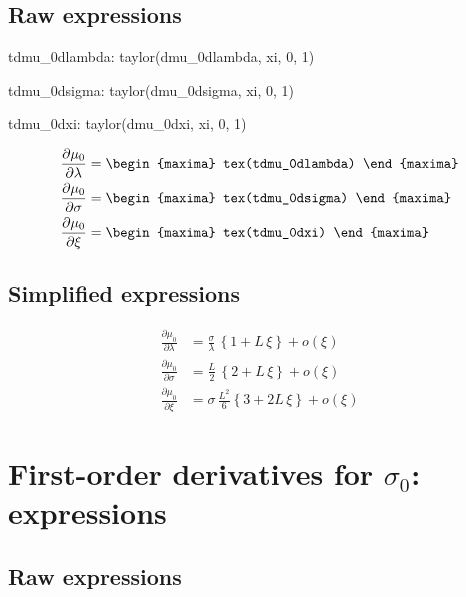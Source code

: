 \subsection*{Raw expressions}
\begin{maxima}
  tdmu_0dlambda: taylor(dmu_0dlambda, xi, 0, 1)
\end{maxima}
\begin{maxima}
  tdmu_0dsigma: taylor(dmu_0dsigma, xi, 0, 1)
\end{maxima}
\begin{maxima}
  tdmu_0dxi: taylor(dmu_0dxi, xi, 0, 1)
\end{maxima}

{\color{MonVertF}
\begin{align*}
  \frac{\partial \mu_0}{\partial \lambda}
  &=
\begin{maxima}
  tex(tdmu_0dlambda)
\end{maxima}\\
 \frac{\partial \mu_0}{\partial \sigma}
  &=
\begin{maxima}
  tex(tdmu_0dsigma)
\end{maxima}\\
\frac{\partial \mu_0 }{\partial \xi}
  &=
\begin{maxima}
  tex(tdmu_0dxi)
\end{maxima}
\end{align*}
}

\subsection*{Simplified expressions}
{\color{red}
\begin{align*}
  \frac{\partial \mu_0}{\partial \lambda}
  &= \frac{\sigma}{\lambda}\, \left\{ 1 + L \, \xi \right\} + o(\xi) \\
 \frac{\partial \mu_0}{\partial \sigma}
  &= \frac{L}{2} \, \left\{ 2 + L\, \xi \right\} + o(\xi) \\
\frac{\partial \mu_0 }{\partial \xi}
  &=  \sigma \, \frac{L^2}{6} \left\{ 3  + 2 L\, \xi \right\} + o(\xi) 
\end{align*}
}

\section{First-order derivatives for $\sigma_0$: expressions}

\subsection*{Raw expressions}

